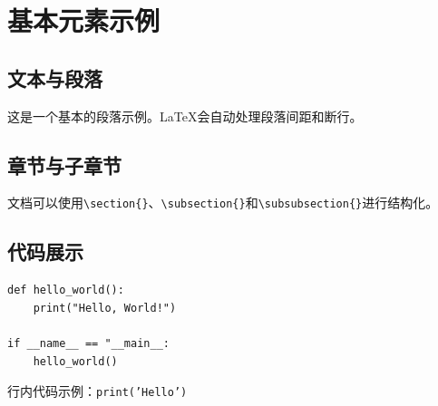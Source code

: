 \documentclass[12pt]{ctexart}
\begin{document}
\begin{sloppypar}
\renewcommand{\contentsname}{目录}
\thispagestyle{empty}
\tableofcontents
\newpage
\hypersetup{linkcolor=red}


\section{基本元素示例}

\subsection{文本与段落}
这是一个基本的段落示例。LaTeX会自动处理段落间距和断行。

\subsection{章节与子章节}
文档可以使用\verb|\section{}|、\verb|\subsection{}|和\verb|\subsubsection{}|进行结构化。

\subsection{代码展示}
\begin{verbatim}
def hello_world():
    print("Hello, World!")
    
if __name__ == "__main__:
    hello_world()
\end{verbatim}

行内代码示例：\texttt{print('Hello')}


\end{sloppypar}
\end{document}
